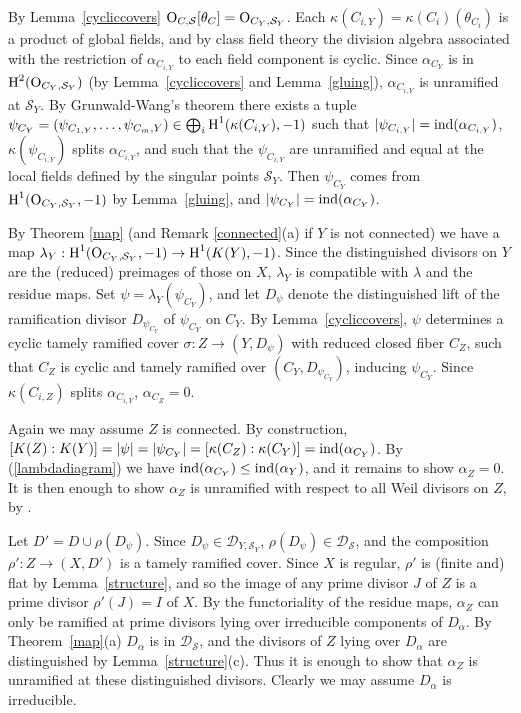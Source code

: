 \documentclass{amsart}
\theoremstyle{plain}
\theoremstyle{definition}
\theoremstyle{remark}
\numberwithin{equation}{section}%
\renewcommand{\H}{{\text{\rm H}}}
\renewcommand{\O}{{\text{\rm O}}}
\renewcommand{\S}{{\mathcal S}}
\newcommand{\ind}{{\text{\rm ind}}}
\newcommand{\red}{{\text{\rm red}}}
\begin{document}
By Lemma~\ref{cycliccovers} $\O_{C,\S}[\theta_C]=\O_{C_Y,\mathcal S_Y}$.
Each $\kappa(C_{i,Y})=\kappa(C_i)(\theta_{C_i})$ is a product of global fields, 
and by class field theory
the division algebra associated with the restriction of
$\alpha_{C_{i,Y}}$ to each field component is cyclic.
Since $\alpha_{C_Y}$ is in $\H^2(\O_{C_Y,\S_Y})$ (by Lemma~\ref{cycliccovers} and Lemma~\ref{gluing}),
$\alpha_{C_{i,Y}}$ is unramified at $\mathcal S_Y$.
By Grunwald-Wang's theorem there exists a tuple
$\psi_{C_Y}=(\psi_{C_{1,Y}},\dots,\psi_{C_m,Y})\in\bigoplus_i\H^1(\kappa(C_{i,Y}),-1)$
such that $|\psi_{C_{i,Y}}|=\ind(\alpha_{C_{i,Y}})$,
$\kappa(\psi_{C_{i,Y}})$ splits $\alpha_{C_{i,Y}}$, and such that
the $\psi_{C_{i,Y}}$ are unramified and equal at the local fields defined by the singular points $\mathcal S_Y$.
Then $\psi_{C_Y}$ comes from $\H^1(\O_{C_Y,\mathcal S_Y},-1)$ by Lemma~\ref{gluing},
and $|\psi_{C_Y}|=\ind(\alpha_{C_Y})$.

By Theorem \ref{map} (and Remark \ref{connected}(a) if $Y$ is not connected)
we have a map $\lambda_Y:\H^1(\O_{C_Y,\mathcal S_Y},-1)\to\H^1(K(Y),-1)$.
Since the distinguished divisors on $Y$ are the (reduced) preimages of those on $X$,
$\lambda_Y$ is compatible with $\lambda$ and the residue maps.
Set $\psi=\lambda_Y(\psi_{C_Y})$, and let $D_\psi$ 
denote the distinguished lift of the ramification divisor $D_{\psi_{C_Y}}$ of $\psi_{C_Y}$ on $C_Y$.
By Lemma~\ref{cycliccovers}, $\psi$ determines a cyclic tamely ramified cover $\sigma:Z\to(Y,D_\psi)$
with reduced closed fiber $C_Z$, 
such that $C_Z$ is cyclic and tamely ramified over $(C_Y,D_{\psi_{C_Y}})$,
inducing $\psi_{C_Y}$.
Since $\kappa(C_{i,Z})$ splits $\alpha_{C_{i,Y}}$, $\alpha_{C_Z}=0$.

Again we may assume $Z$ is connected.
By construction, $[K(Z):K(Y)]=|\psi|=|\psi_{C_Y}|=[\kappa(C_Z):\kappa(C_Y)]=\ind(\alpha_{C_Y})$.
By (\ref{lambdadiagram}) we have 
$\ind(\alpha_{C_Y})\leq \ind(\alpha_Y)$, and it remains to show $\alpha_Z=0$.
It is then enough to show $\alpha_Z$ is unramified with respect to all Weil divisors on $Z$,
by \cite[Lemma 3.5]{BMT}.

Let $D'=D\cup\rho(D_\psi)$.  
Since $D_\psi\in\mathscr D_{Y,\S_Y}$, $\rho(D_\psi)\in\mathscr D_\S$, and the composition
$\rho':Z\to (X,D')$ is a tamely ramified cover.
Since $X$ is regular, $\rho'$ is (finite and) flat by Lemma~\ref{structure}, 
and so the image of any prime divisor $J$ of $Z$
is a prime divisor $\rho'(J)=I$ of $X$.
By the functoriality of the residue maps, $\alpha_Z$ can only be ramified at prime divisors lying
over irreducible components of $D_\alpha$.
By Theorem~\ref{map}(a) $D_\alpha$ is in $\mathscr D_\S$, and the divisors of $Z$ lying over $D_\alpha$
are distinguished by Lemma~\ref{structure}(c).
Thus it is enough to show that $\alpha_Z$ is unramified at these distinguished divisors.
Clearly we may assume $D_\alpha$ is irreducible.
\end{document}
